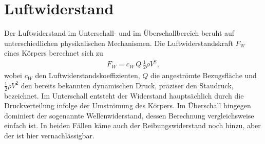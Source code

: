 %
%
%
%
\section{Luftwiderstand\label{ueberschall:section:Luftwiderstand}}
Der Luftwiderstand im Unterschall- und im Überschallbereich 
beruht auf unterschiedlichen physikalischen Mechanismen.
Die Luftwiderstandskraft $F_W$~\cite{StroemwiderWikiDE} eines Körpers 
berechnet sich zu
\begin{align*}
    F_W
    = c_W \, Q \, \frac{1}{2} \rho V^2,
\end{align*}
wobei $c_W$ den Luftwiderstandskoeffizienten, $Q$ die angeströmte 
Bezugsfläche und $\tfrac{1}{2}\rho V^2$ den bereits bekannten dynamischen Druck, 
präziser den Staudruck, bezeichnet.
Im Unterschall entsteht der Widerstand hauptsächlich durch die Druckverteilung 
infolge der Umströmung des Körpers. 
Im Überschall hingegen dominiert der sogenannte Wellenwiderstand, 
dessen Berechnung vergleichsweise einfach ist.
In beiden Fällen käme auch der Reibungswiderstand noch hinzu,
aber der ist hier vernachlässigbar.

